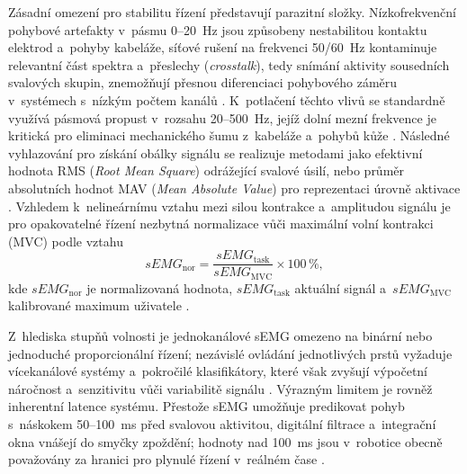 \documentclass[FZS,DP]{tulthesis}
\begin{document}
Zásadní omezení pro stabilitu řízení představují parazitní složky.
Nízkofrekvenční pohybové artefakty v~pásmu 0–20~Hz jsou způsobeny nestabilitou kontaktu elektrod a~pohyby kabeláže, síťové rušení na frekvenci 50/60~Hz kontaminuje relevantní část spektra a~přeslechy (\textit{crosstalk}), tedy snímání aktivity sousedních svalových skupin, znemožňují přesnou diferenciaci pohybového záměru v~systémech s~nízkým počtem kanálů \cite{ALCAN20231026, Chowdhury2013917, DeLuca2010, Song2023823, Sul2025627}.
K~potlačení těchto vlivů se standardně využívá pásmová propust v~rozsahu 20–500~Hz, jejíž dolní mezní frekvence je kritická pro eliminaci mechanického šumu z~kabeláže a~pohybů kůže \cite{DeLuca2010, Song2023823, Stavdahl2011, Sul2025627}.
Následné vyhlazování pro získání obálky signálu se realizuje metodami jako efektivní hodnota RMS (\textit{Root Mean Square}) odrážející svalové úsilí, nebo průměr absolutních hodnot MAV (\textit{Mean Absolute Value}) pro reprezentaci úrovně aktivace \cite{Sul2025627, Wu2024613}.
Vzhledem k~nelineárnímu vztahu mezi silou kontrakce a~amplitudou signálu je pro opakovatelné řízení nezbytná normalizace vůči maximální volní kontrakci (MVC) podle vztahu
%
\begin{equation}
    sEMG_{\mathrm{nor}} = \frac{sEMG_{\mathrm{task}}}{sEMG_{\mathrm{MVC}}} \times 100\,\%,
\end{equation}
%
kde $sEMG_{\mathrm{nor}}$ je normalizovaná hodnota, $sEMG_{\mathrm{task}}$ aktuální signál a~$sEMG_{\mathrm{MVC}}$ kalibrované maximum uživatele \cite{Wu2024613}.

Z~hlediska stupňů volnosti je jednokanálové sEMG omezeno na binární nebo jednoduché proporcionální řízení; nezávislé ovládání jednotlivých prstů vyžaduje vícekanálové systémy a~pokročilé klasifikátory, které však zvyšují výpočetní náročnost a~senzitivitu vůči variabilitě signálu \cite{Song2023823, Sul2025627}.
Výrazným limitem je rovněž inherentní latence systému.
Přestože sEMG umožňuje predikovat pohyb s~náskokem 50–100~ms před svalovou aktivitou, digitální filtrace a~integrační okna vnášejí do smyčky zpoždění; hodnoty nad 100~ms jsou v~robotice obecně považovány za hranici pro plynulé řízení v~reálném čase \cite{Lee20241121, Song2023823, Sul2025627}.
\end{document}
